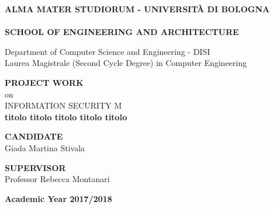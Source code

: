 \thispagestyle{empty}
\begin{titlepage}

\vspace*{-1.5cm}
\begin{center}
  \large
  \textbf{ALMA MATER STUDIORUM - UNIVERSIT\`A DI BOLOGNA}\\
  
  \hrulefill\\
  
  \textbf{SCHOOL OF ENGINEERING AND ARCHITECTURE}\\
  \vspace*{.75cm}
  
  
  Department of Computer Science and Engineering - DISI\\
  Laurea Magistrale (Second Cycle Degree) in Computer Engineering\\
  
  \vspace*{1.2cm}
  
  
  \textbf{PROJECT WORK}\\
  \vspace*{.4cm}
  on\\
  \vspace*{.4cm}
  INFORMATION SECURITY M\\

  \vspace*{2cm} \LARGE
  \textbf{titolo titolo titolo titolo titolo}\\
 \end{center}
 
 \vspace*{3cm}
 
 \begin{flushleft}
  \textbf{CANDIDATE}\\ Giada Martina Stivala \\
\end{flushleft}

\vspace*{-2cm}

 \begin{flushright}
  \textbf{SUPERVISOR}\\ Professor Rebecca Montanari \\
 \end{flushright}


\vspace*{2cm}

\begin{center}
	\textbf{
  Academic Year 2017/2018\\
  }
\end{center} 
\clearpage
\end{titlepage}